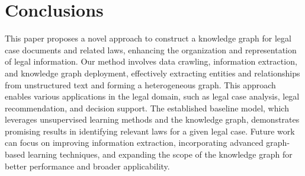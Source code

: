 \documentclass[conference]{IEEEtran}
\begin{document}
\section{Conclusions}
This paper proposes a novel approach to construct a knowledge graph for legal case documents and related laws, enhancing the organization and representation of legal information. Our method involves data crawling, information extraction, and knowledge graph deployment, effectively extracting entities and relationships from unstructured text and forming a heterogeneous graph. This approach enables various applications in the legal domain, such as legal case analysis, legal recommendation, and decision support. The established baseline model, which leverages unsupervised learning methods and the knowledge graph, demonstrates promising results in identifying relevant laws for a given legal case. Future work can focus on improving information extraction, incorporating advanced graph-based learning techniques, and expanding the scope of the knowledge graph for better performance and broader applicability.






\end{document}
